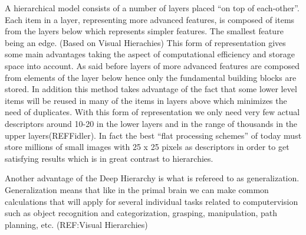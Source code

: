 A hierarchical model consists of a number of layers placed “on top of each-other”. Each item in a layer, representing more advanced features, is composed of items from the layers below which represents simpler features. The smallest feature being an edge. 
(Based on Visual Hierachies)
This form of representation gives some main advantages taking the aspect of computational efficiency and storage space into account. As said before layers of more advanced features are composed from elements of the layer below hence only the fundamental building blocks are stored. In addition this method takes advantage of the fact that some lower level items will be reused in many of the items in layers above which minimizes the need of duplicates. With this form of representation we only need very few actual descriptors around 10-20 in the lower layers and in the range of thousands in the upper layers(REFFidler). 
In fact the best “flat processing schemes” of today must store millions of small images with 25 x 25 pixels as descriptors in order to get satisfying results which is in great contrast to hierarchies.

Another advantage of the Deep Hierarchy is what is refereed to as generalization. Generalization means that like in the primal brain we can make common calculations that will apply for several individual tasks related to computervision such as object recognition and categorization, grasping, manipulation, path
 planning, etc. (REF:Visual Hierarchies)